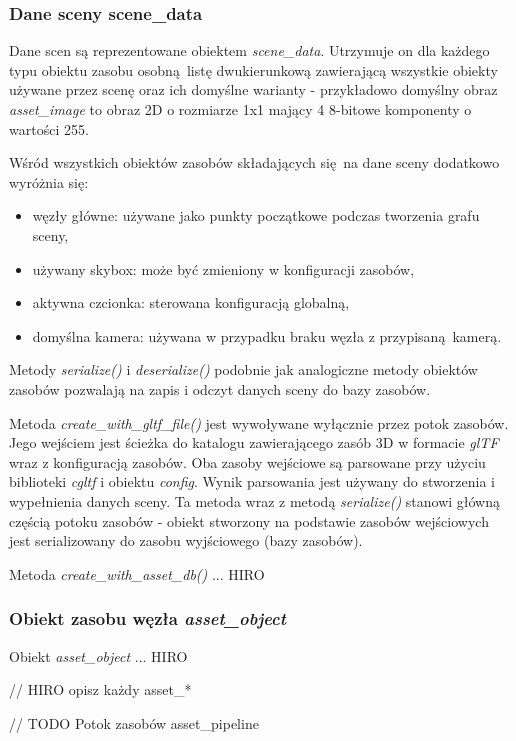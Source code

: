 \subsubsection{Dane sceny scene\_data}
Dane scen są reprezentowane obiektem \textit{scene\_data}.
Utrzymuje on dla każdego typu obiektu zasobu osobną listę dwukierunkową zawierającą wszystkie obiekty używane przez scenę oraz ich domyślne warianty - przykładowo domyślny obraz \textit{asset\_image} to obraz 2D o rozmiarze 1x1 mający 4 8-bitowe komponenty o wartości 255.

Wśród wszystkich obiektów zasobów składających się na dane sceny dodatkowo wyróżnia się:
\begin{itemize}
	\item węzły główne: używane jako punkty początkowe podczas tworzenia grafu sceny,
	\item używany skybox: może być zmieniony w konfiguracji zasobów,
	\item aktywna czcionka: sterowana konfiguracją globalną,
	\item domyślna kamera: używana w przypadku braku węzła z przypisaną kamerą.
\end{itemize}

Metody \textit{serialize()} i \textit{deserialize()} podobnie jak analogiczne metody obiektów zasobów pozwalają na zapis i odczyt danych sceny do bazy zasobów.

Metoda \textit{create\_with\_gltf\_file()} jest wywoływane wyłącznie przez potok zasobów.
Jego wejściem jest ścieżka do katalogu zawierającego zasób 3D w formacie \textit{glTF} wraz z konfiguracją zasobów.
Oba zasoby wejściowe są parsowane przy użyciu biblioteki \textit{cgltf} i obiektu \textit{config}.
Wynik parsowania jest używany do stworzenia i wypełnienia danych sceny.
Ta metoda wraz z metodą \textit{serialize()} stanowi główną częścią potoku zasobów - obiekt stworzony na podstawie zasobów wejściowych jest serializowany do zasobu wyjściowego (bazy zasobów).

Metoda \textit{create\_with\_asset\_db()} ... HIRO

\subsubsection{Obiekt zasobu węzła \textit{asset\_object}}
Obiekt \textit{asset\_object} ... HIRO

// HIRO opisz każdy asset_*

// TODO Potok zasobów asset\_pipeline

